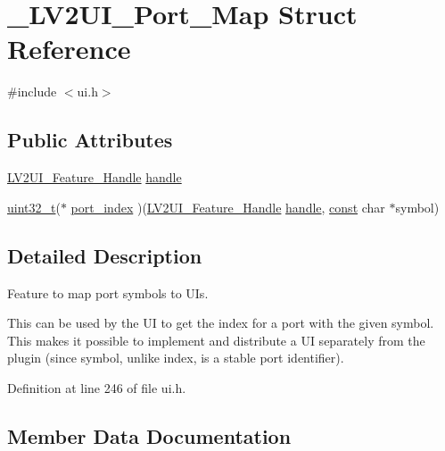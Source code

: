 \hypertarget{struct___l_v2_u_i___port___map}{}\section{\+\_\+\+L\+V2\+U\+I\+\_\+\+Port\+\_\+\+Map Struct Reference}
\label{struct___l_v2_u_i___port___map}


{\ttfamily \#include $<$ui.\+h$>$}

\subsection*{Public Attributes}
\begin{DoxyCompactItemize}
\item 
\hyperlink{ui_8h_aee1f066da7d217c82bafa46bccbfde94}{L\+V2\+U\+I\+\_\+\+Feature\+\_\+\+Handle} \hyperlink{struct___l_v2_u_i___port___map_a3cd2d716f3f3d42bda10a4520108ea2e}{handle}
\item 
\hyperlink{lib-src_2ffmpeg_2win32_2stdint_8h_a6eb1e68cc391dd753bc8ce896dbb8315}{uint32\+\_\+t}($\ast$ \hyperlink{struct___l_v2_u_i___port___map_a5a011cf306c6f69084beb121d296e885}{port\+\_\+index} )(\hyperlink{ui_8h_aee1f066da7d217c82bafa46bccbfde94}{L\+V2\+U\+I\+\_\+\+Feature\+\_\+\+Handle} \hyperlink{struct___l_v2_u_i___port___map_a3cd2d716f3f3d42bda10a4520108ea2e}{handle}, \hyperlink{getopt1_8c_a2c212835823e3c54a8ab6d95c652660e}{const} char $\ast$symbol)
\end{DoxyCompactItemize}


\subsection{Detailed Description}
Feature to map port symbols to U\+Is.

This can be used by the UI to get the index for a port with the given symbol. This makes it possible to implement and distribute a UI separately from the plugin (since symbol, unlike index, is a stable port identifier). 

Definition at line 246 of file ui.\+h.



\subsection{Member Data Documentation}
